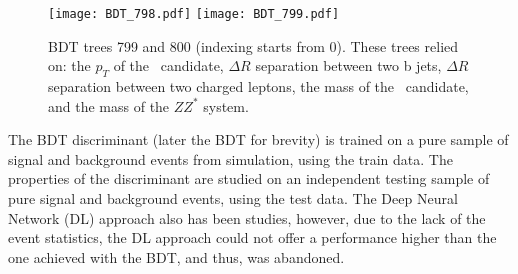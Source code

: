 \begin{figure}[H]
  \begin{center}
    \texttt{[image: BDT\_798.pdf]}
    \texttt{[image: BDT\_799.pdf]}\\
     \caption{BDT trees 799 and 800 (indexing starts from 0). These trees relied on: the $p_T$ of the \Zll~candidate, 
     $\Delta R$ separation between two b jets,
     $\Delta R$ separation between two charged leptons, 
      the mass of the \HBB~candidate, and the mass of the $ZZ^*$ system.}       
     \label{fig:bdt_trees_3}
  \end{center}
\end{figure}
           
           
           The BDT discriminant (later the BDT for brevity) is trained
           on a pure sample of signal and background events from simulation, using the train data.
           The  properties of the discriminant are studied on an independent testing sample of pure signal 
           and background events, using the test data. The Deep Neural Network (DL) approach also has been studies, however, due to the lack of the event statistics, the DL approach could not offer a performance higher than the one achieved with the BDT, and thus, was abandoned. 
           
           
           
           
           
           
           
